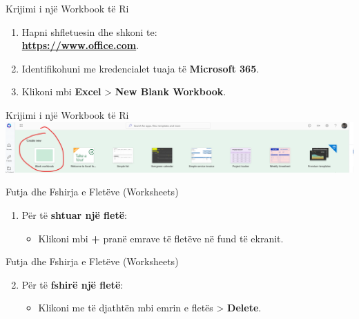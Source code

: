 \documentclass[
  ignorenonframetext,
]{beamer}
\providecommand{\tightlist}{%
  \setlength{\itemsep}{0pt}\setlength{\parskip}{0pt}}
\begin{document}
\begin{frame}{Krijimi i një Workbook të Ri}
\label{krijimi-i-njuxeb-workbook-tuxeb-ri}
\begin{enumerate}
\item
  Hapni shfletuesin dhe shkoni te:\\
  \textbf{\url{https://www.office.com}}.
\item
  Identifikohuni me kredencialet tuaja të \textbf{Microsoft 365}.
\item
  Klikoni mbi \textbf{Excel} \textgreater{} \textbf{New Blank Workbook}.
\end{enumerate}
\end{frame}

\begin{frame}{Krijimi i një Workbook të Ri}
\label{krijimi-i-njuxeb-workbook-tuxeb-ri-1}
\includegraphics{./images/excel2.png}
\end{frame}

\begin{frame}{Futja dhe Fshirja e Fletëve (Worksheets)}
\label{futja-dhe-fshirja-e-fletuxebve-worksheets}
\begin{enumerate}
\item
  Për të \textbf{shtuar një fletë}:

  \begin{itemize}
  \tightlist
  \item
    Klikoni mbi \textbf{+} pranë emrave të fletëve në fund të ekranit.
  \end{itemize}
\end{enumerate}
\end{frame}

\begin{frame}{Futja dhe Fshirja e Fletëve (Worksheets)}
\label{futja-dhe-fshirja-e-fletuxebve-worksheets-1}
\begin{enumerate}
\setcounter{enumi}{1}
\item
  Për të \textbf{fshirë një fletë}:

  \begin{itemize}
  \tightlist
  \item
    Klikoni me të djathtën mbi emrin e fletës \textgreater{}
    \textbf{Delete}.
  \end{itemize}
\end{enumerate}
\end{frame}
\end{document}
